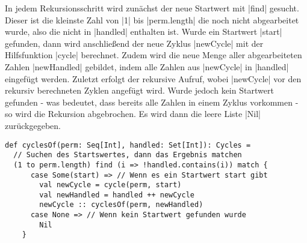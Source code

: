 In jedem Rekursionsschritt wird zunächst der neue Startwert mit |find| gesucht.
Dieser ist die kleinste Zahl von |1| bis |perm.length| die noch nicht abgearbeitet wurde, also die nicht in |handled| enthalten ist.
Wurde ein Startwert |start| gefunden, dann wird anschließend der neue Zyklus |newCycle| mit der Hilfsfunktion |cycle| berechnet.
Zudem wird die neue Menge aller abgearbeiteten Zahlen |newHandled| gebildet, indem alle Zahlen aus |newCycle| in |handled| eingefügt werden.
Zuletzt erfolgt der rekursive Aufruf, wobei |newCycle| vor den rekursiv berechneten Zyklen angefügt wird.
Wurde jedoch kein Startwert gefunden - was bedeutet, dass bereits alle Zahlen in einem Zyklus vorkommen - so wird die Rekursion abgebrochen.
Es wird dann die leere Liste |Nil| zurückgegeben.
\lstset{language=Scala}
\lstset{basicstyle=\ttfamily}
\begin{lstlisting}
def cyclesOf(perm: Seq[Int], handled: Set[Int]): Cycles =
  // Suchen des Startswertes, dann das Ergebnis matchen
  (1 to perm.length) find (i => !handled.contains(i)) match {
      case Some(start) => // Wenn es ein Startwert start gibt
        val newCycle = cycle(perm, start)
        val newHandled = handled ++ newCycle
        newCycle :: cyclesOf(perm, newHandled)
      case None => // Wenn kein Startwert gefunden wurde
        Nil
    }
\end{lstlisting}
